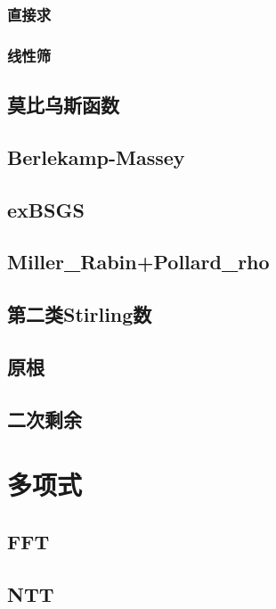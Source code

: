 ﻿\documentclass[a4paper,twocolumn]{article}
\begin{document}
\subsubsection{直接求}

\subsubsection{线性筛}

\subsection{莫比乌斯函数}

\subsection{Berlekamp-Massey}

\subsection{exBSGS}

\subsection{Miller\_Rabin+Pollard\_rho}

\subsection{第二类Stirling数}

\subsection{原根}
\begin{spacing}{1.5}

\end{spacing}

\subsection{二次剩余}

\section{多项式}
\subsection{FFT}

\subsection{NTT}

\end{document}
